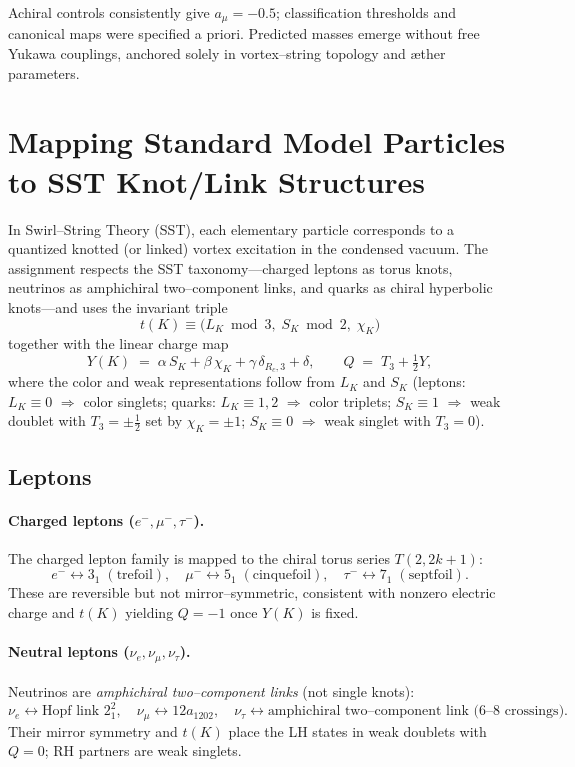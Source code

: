 \documentclass[11pt, preprint,titlepage]{revtex4-2}
\begin{document}
    Achiral controls consistently give $a_\mu=-0.5$; classification thresholds and canonical maps were specified a priori.
    Predicted masses emerge without free Yukawa couplings, anchored solely in vortex–string topology and æther parameters.


\section{Mapping Standard Model Particles to SST Knot/Link Structures}

In Swirl–String Theory (SST), each elementary particle corresponds to a quantized knotted (or linked) vortex excitation in the condensed vacuum. The assignment respects the SST taxonomy—charged leptons as torus knots, neutrinos as amphichiral two–component links, and quarks as chiral hyperbolic knots—and uses the invariant triple
\[
    t(K) \equiv \big(L_K \bmod 3,\; S_K \bmod 2,\; \chi_K\big)
\]
together with the linear charge map
\[
    Y(K) \;=\; \alpha\,S_K + \beta\,\chi_K + \gamma\,\delta_{R_c,3} + \delta,\qquad
    Q \;=\; T_3 + \tfrac12 Y,
\]
where the color and weak representations follow from $L_K$ and $S_K$ (leptons: $L_K\!\equiv\!0$ $\Rightarrow$ color singlets; quarks: $L_K\!\equiv\!1,2$ $\Rightarrow$ color triplets; $S_K\!\equiv\!1$ $\Rightarrow$ weak doublet with $T_3=\pm\tfrac12$ set by $\chi_K=\pm1$; $S_K\!\equiv\!0$ $\Rightarrow$ weak singlet with $T_3=0$).

\subsection{Leptons}

    \paragraph{Charged leptons ($e^-,\mu^-,\tau^-$).}
        The charged lepton family is mapped to the chiral torus series $T(2,2k{+}1)$:
        \[
            e^- \leftrightarrow 3_1 \;(\text{trefoil}),\quad
            \mu^- \leftrightarrow 5_1 \;(\text{cinquefoil}),\quad
            \tau^- \leftrightarrow 7_1 \;(\text{septfoil}).
        \]
        These are reversible but not mirror–symmetric, consistent with nonzero electric charge and $t(K)$ yielding $Q=-1$ once $Y(K)$ is fixed.

    \paragraph{Neutral leptons ($\nu_e,\nu_\mu,\nu_\tau$).}
        Neutrinos are \emph{amphichiral two–component links} (not single knots):
        \[
            \nu_e \leftrightarrow \text{Hopf link } 2^2_{1},\quad
            \nu_\mu \leftrightarrow 12a_{1202},\quad
            \nu_\tau \leftrightarrow \text{amphichiral two–component link (6–8 crossings).}
        \]
        Their mirror symmetry and $t(K)$ place the LH states in weak doublets with $Q=0$; RH partners are weak singlets.
\end{document}
